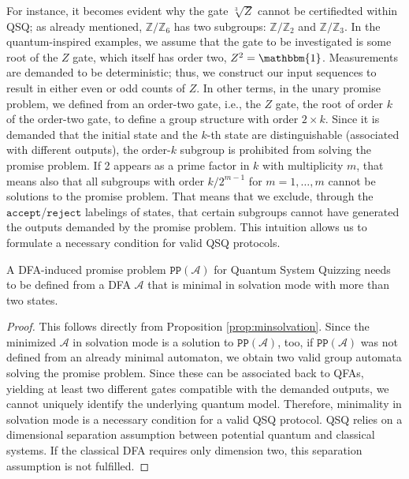 \documentclass[../main.tex]{subfiles}
\begin{document}
For instance, it becomes evident why the gate $\sqrt[3]{Z}$ cannot be certifiedted within QSQ; as already mentioned, $\mathbb{Z}/\mathbb{Z}_6$ has two subgroups: $\mathbb{Z}/\mathbb{Z}_2$ and $\mathbb{Z}/\mathbb{Z}_3$. In the quantum-inspired examples, we assume that the gate to be investigated is some root of the $Z$ gate, which itself has order two, $Z^2 = \mathbbm{1}$. Measurements are demanded to be deterministic; thus, we construct our input sequences to result in either even or odd counts of $Z$. In other terms, in the unary promise problem, we defined from an order-two gate, i.e., the $Z$ gate, the root of order $k$ of the order-two gate, to define a group structure with order $2 \times k$. Since it is demanded that the initial state and the $k$-th state are distinguishable (associated with different outputs), the order-$k$ subgroup is prohibited from solving the promise problem. If 2 appears as a prime factor in $k$ with multiplicity $m$, that means also that all subgroups with order $k / 2^{m-1}$ for $m = 1, \ldots, m$ cannot be solutions to the promise problem.
That means that we exclude, through the $\mathtt{accept}$/$\mathtt{reject}$  labelings of states, that certain subgroups cannot have generated the outputs demanded by the promise problem. This intuition allows us to formulate a necessary condition for valid QSQ protocols.

\begin{theorem}
    A DFA-induced promise problem $\mathtt{PP}(\mathcal{A})$ for Quantum System Quizzing needs to be defined from a DFA $\mathcal{A}$ that is minimal in solvation mode with more than two states. 
\end{theorem}

\begin{proof}
    This follows directly from Proposition \ref{prop:minsolvation}. Since the minimized $\mathcal{A}$ in solvation mode is a solution to $\mathtt{PP}(\mathcal{A})$, too, if $\mathtt{PP}(\mathcal{A})$ was not defined from an already minimal automaton, we obtain two valid group automata solving the promise problem. Since these can be associated back to QFAs, yielding at least two different gates compatible with the demanded outputs, we cannot uniquely identify the underlying quantum model. Therefore, minimality in solvation mode is a necessary condition for a valid QSQ protocol.
    QSQ relies on a dimensional separation assumption between potential quantum and classical systems. If the classical DFA requires only dimension two, this separation assumption is not fulfilled.
\end{proof}
\end{document}
